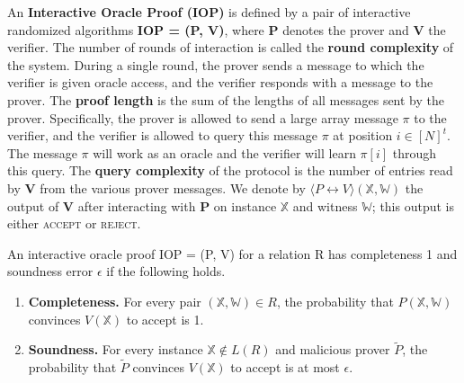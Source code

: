 \begin{definition}
An \textbf{Interactive Oracle Proof (IOP)} is defined by a pair of interactive randomized
algorithms \textbf{IOP = (P, V)}, where \textbf{P} denotes the prover and \textbf{V} the verifier. 
The number of rounds of interaction is called the \textbf{round complexity} of the system. 
During a single round, the prover sends a message to which the verifier is given oracle access, and the verifier responds with a message to the prover. 
The \textbf{proof length} is the sum of the lengths of all messages sent by the prover. Specifically, the prover is allowed to send a large array message $\pi$ to the verifier, and the verifier is allowed to query this message $\pi$ at position $i \in [N]^t$. The message $\pi$ will work as an oracle and the verifier will learn $\pi[i]$ through this query.
The \textbf{query complexity} of the protocol is the number of entries read by \textbf{V} from the various prover messages.
We denote by $\langle P \leftrightarrow V \rangle (\mathbb{X}, \mathbb{W})$ the output of \textbf{V} after interacting with \textbf{P} on instance $\mathbb{X}$ and witness $\mathbb{W}$; this output is either \textsc{accept} or \textsc{reject}.

An interactive oracle proof IOP = (P, V) for a relation R has completeness 1 and soundness error $\epsilon$ if the following holds.

\begin{enumerate}
    \item \textbf{Completeness.}
    For every pair $(\mathbb{X}, \mathbb{W}) \in R$, the probability that $P(\mathbb{X}, \mathbb{W})$ convinces $V(\mathbb{X})$ to accept is 1.
    
    \item \textbf{Soundness.}
    For every instance $\mathbb{X} \not\in L(R)$ and malicious prover $\tilde{P}$, the probability that $\tilde{P}$ convinces $V(\mathbb{X})$ to accept is at most $\epsilon$.
\end{enumerate}
\end{definition}

